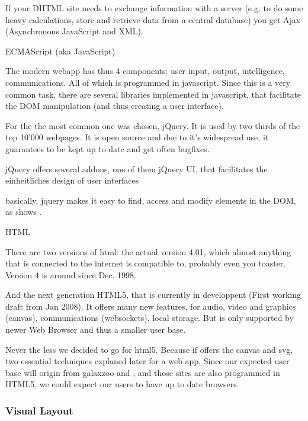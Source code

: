 If your DHTML site needs to exchange information with a server (e.g. to do some heavy calculations, store and retrieve data from a central database) you get Ajax (Asynchronous JavaScript and XML).




ECMAScript (aka JavaScript)


The modern webapp has thus 4 components: user input, output, intelligence, communications.
All of which is programmed in javascript.
Since this is a very common task, there are several libraries implemented in javascript, that facilitate the DOM manipulation (and thus creating a user interface).

For \spl the the most common one was chosen, jQuery.
It is used by two thirds of the top 10'000 webpages.
It is open source and due to it's widespread use, it guarantees to be kept up to date and get often bugfixes.

jQuery offers several addons, one of them jQuery UI, that facilitates the einheitliches design of user interfaces

basically, jquery makes it easy to find, access and modify elements in the DOM, as shows .





HTML

There are two versions of html: the actual version 4.01, which almost anything that is connected to the internet is compatible to, probably even you toaster. Version 4 is around since Dec. 1998.

And the next generation HTML5, that is currently in developpent (First working draft from Jan 2008).
It offers many new features, for audio, video and graphics (canvas), communications (websockets), local storage.
But is only supported by newer Web Browser and thus a smaller user base.

Never the less we decided to go for html5. Because if offers the canvas and svg, two essential techniques explaned later for a web app.
Since our expected user base will origin from galaxzoo and \sw, and those sites are also programmed in HTML5, we could expect our users to have up to date browsers.



\subsubsection{Visual Layout}
\label{sec:client_vis_layout}

